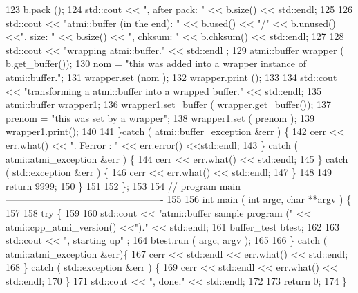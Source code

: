 \begin{DoxyCodeInclude}
123         b.pack ();
124         std::cout << ", after pack: " << b.size() << std::endl;
125 
126         std::cout << "atmi::buffer (in the end): " << b.used() << "/" << b.unused() <<", size: " <<
       b.size() << ", chksum: " << b.chksum() <<  std::endl;
127 
128         std::cout << "wrapping atmi::buffer." << std::endl ;
129         atmi::buffer wrapper ( b.get\_buffer());
130         nom = "this was added into a wrapper instance of atmi::buffer.";
131         wrapper.set (nom );
132         wrapper.print ();
133 
134         std::cout << "transforming a atmi::buffer into a wrapped buffer." << std::endl;
135         atmi::buffer wrapper1;
136         wrapper1.set\_buffer ( wrapper.get\_buffer());
137         prenom = "this was set by a wrapper";
138         wrapper1.set ( prenom );
139         wrapper1.print();
140 
141       \}catch ( atmi::buffer\_exception &err ) \{
142         cerr << err.what() << ". Ferror : " << err.error() <<std::endl;
143       \} catch ( atmi::atmi\_exception &err ) \{
144         cerr << err.what() << std::endl;
145       \} catch ( std::exception &err ) \{
146         cerr << err.what() << std::endl;
147       \}
148 
149       return 9999;
150     \}
151 
152 \};
153 
154 // program main -------------------------------------------------
155 
156 int main ( int argc, char **argv ) \{
157 
158   try \{
159 
160     std::cout << "atmi::buffer sample program (" << atmi::cpp\_atmi\_version() <<")." << std::endl;
161     buffer\_test btest;
162 
163     std::cout << ", starting up" ;
164     btest.run ( argc, argv );
165 
166   \} catch ( atmi::atmi\_exception &err)\{
167     cerr << std::endl << err.what() << std::endl;
168   \} catch ( std::exception &err ) \{
169     cerr << std::endl << err.what() << std::endl;
170   \}
171   std::cout << ", done." << std::endl;
172 
173   return 0;
174 \}
\end{DoxyCodeInclude}
 